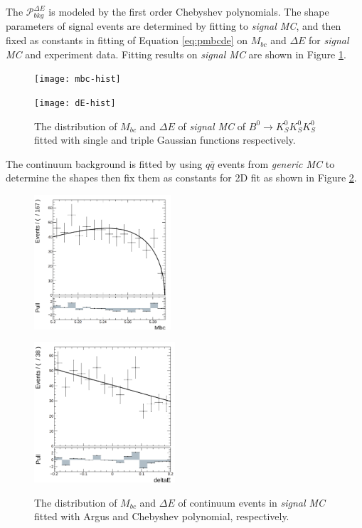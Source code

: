  The $\mathcal{P}_{bkg}^{\Delta{E}}$ is modeled by the first order Chebyshev polynomials. The shape parameters of signal events are determined by fitting to \textit{signal MC}, and  then fixed as constants in fitting of Equation \ref{eq:pmbcde} on $M_{bc}$ and $\Delta E$ for \textit{signal MC} and experiment data. Fitting results on \textit{signal MC} are shown in Figure \ref{fig:mbcde1D}. 
 \begin{figure}[htbp]
 	\begin{minipage}[b]{0.5\linewidth}
 		\centering 
 		\texttt{[image: mbc-hist]}
 	\end{minipage}
 	\begin{minipage}[b]{0.5\linewidth}
 		\centering 
 		\texttt{[image: dE-hist]}
 	\end{minipage}
 	\caption{The distribution of $M_{bc}$ and $\Delta E$ of \textit{signal MC} of $B^0 \to K_S^0  K_S^0  K_S^0$ fitted with single and triple Gaussian functions respectively.}
 	\label{fig:mbcde1D}
 \end{figure}
The continuum background is fitted by using $q\bar{q}$ events from \textit{generic MC} to determine the shapes then fix them as constants for 2D fit as shown in Figure \ref{fig:bkgmbcde}.
\begin{figure}[htbp]
	\begin{minipage}[b]{0.5\linewidth}
		\centering 
		\includegraphics[height=5cm]{figures/mbc-cs-hist}
		\label{}
	\end{minipage}
	\begin{minipage}[b]{0.5\linewidth}
		\centering 
		\includegraphics[height=5.2cm]{figures/dE-cs-hist}
		\label{}
	\end{minipage}
	\caption{The distribution of $M_{bc}$ and $\Delta E$ of continuum events in \textit{signal MC} fitted with Argus and Chebyshev polynomial, respectively.}
	\label{fig:bkgmbcde}
\end{figure}

